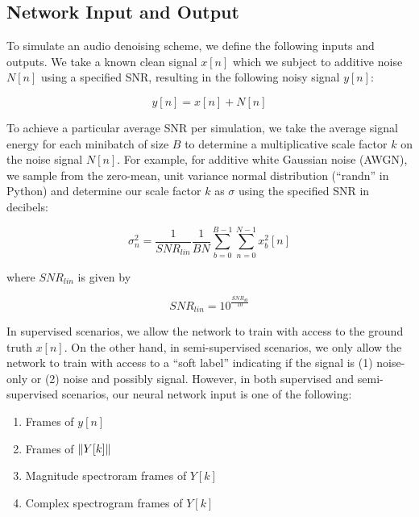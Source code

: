 
\subsection{Network Input and Output}
To simulate an audio denoising scheme, we define the following inputs and outputs. We take a known clean signal $x[n]$ which we subject to additive noise $N[n]$ using a specified SNR, resulting in the following noisy signal $y[n]$:

\begin{equation}
y[n] = x[n] + N[n]
\end{equation}

To achieve a particular average SNR per simulation, we take the average signal energy for each minibatch of size $B$ to determine a multiplicative scale factor $k$ on the noise signal $N[n]$. For example, for additive white Gaussian noise (AWGN), we sample from the zero-mean, unit variance normal distribution (``randn'' in Python) and determine our scale factor $k$ as $\sigma$ using the specified SNR in decibels:

\begin{equation}
\sigma_n^{2} = \dfrac{1}{SNR_{lin}}\dfrac{1}{BN}\sum_{b=0}^{B-1} \sum_{n=0}^{N-1} x_{b}^{2}[n]
\end{equation}

where $SNR_{lin}$ is given by

\begin{equation}
SNR_{lin} = 10^{\frac{SNR_{db}}{10}}
\end{equation}

In supervised scenarios, we allow the network to train with access to the ground truth $x[n]$. On the other hand, in semi-supervised scenarios, we only allow the network to train with access to a ``soft label'' indicating if the signal is (1) noise-only or (2) noise and possibly signal. \cite{stow} However, in both supervised and semi-supervised scenarios, our neural network input is one of the following:

\begin{enumerate}
    \item Frames of $y[n]$
    \item Frames of $\lVert Y[k]\rVert$
    \item Magnitude spectroram frames of $Y[k]$
    \item Complex spectrogram frames of $Y[k]$
\end{enumerate}

